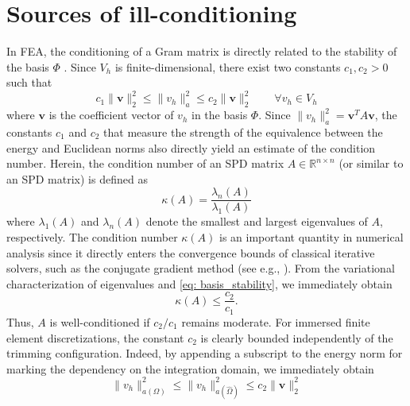 \documentclass{article}
\numberwithin{equation}{section}
\theoremstyle{definition}
\begin{document}
\section{Sources of ill-conditioning}
\label{se: ill_conditioning_origin}
In FEA, the conditioning of a Gram matrix is directly related to the stability of the basis $\Phi$ \cite{lyche2018spline}. Since $V_h$ is finite-dimensional, there exist two constants $c_1,c_2>0$ such that
\begin{equation}
\label{eq: basis_stability}
c_1 \|\bm{v}\|_2^2 \leq \|v_h\|_a^2 \leq c_2 \|\bm{v}\|_2^2 \qquad \forall v_h \in V_h
\end{equation}
where $\bm{v}$ is the coefficient vector of $v_h$ in the basis $\Phi$. Since $\|v_h\|_a^2=\bm{v}^TA\bm{v}$, the constants $c_1$ and $c_2$ that measure the strength of the equivalence between the energy and Euclidean norms also directly yield an estimate of the condition number. Herein, the condition number of an SPD matrix $A \in \mathbb{R}^{n \times n}$ (or similar to an SPD matrix) is defined as
\begin{equation*}
    \kappa(A) = \frac{\lambda_n(A)}{\lambda_1(A)}
\end{equation*}
where $\lambda_1(A)$ and $\lambda_n(A)$ denote the smallest and largest eigenvalues of $A$, respectively. The condition number $\kappa(A)$ is an important quantity in numerical analysis since it directly enters the convergence bounds of classical iterative solvers, such as the conjugate gradient method (see e.g., \cite{greenbaum1997iterative,saad2003iterative}). From the variational characterization of eigenvalues \cite[Theorem 4.2.6]{horn2012matrix} and \eqref{eq: basis_stability}, we immediately obtain
\begin{equation*}
    \kappa(A) \leq \frac{c_2}{c_1}.
\end{equation*}
Thus, $A$ is well-conditioned if $c_2/c_1$ remains moderate. For immersed finite element discretizations, the constant $c_2$ is clearly bounded independently of the trimming configuration. Indeed, by appending a subscript to the energy norm for marking the dependency on the integration domain, we immediately obtain
\begin{equation*}
    \|v_h\|_{a(\Omega)}^2 \leq \|v_h\|_{a(\widehat{\Omega})}^2 \leq c_2 \|\bm{v}\|_2^2
\end{equation*}
\end{document}
